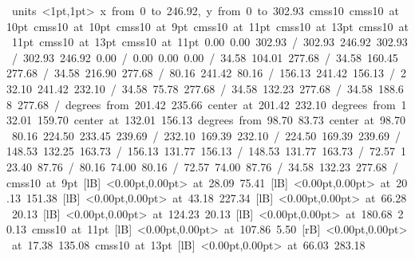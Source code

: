 \hbox{\beginpicture
\setcoordinatesystem units <1pt,1pt>
\setplotarea x from 0 to 246.92, y from 0 to 302.93
\setlinear
\font\picfont cmss10\picfont
\font\picfont cmss10 at 10pt\picfont
\font\picfont cmss10 at 10pt\picfont
\font\picfont cmss10 at 9pt\picfont
\font\picfont cmss10 at 11pt\picfont
\font\picfont cmss10 at 13pt\picfont
\font\picfont cmss10 at 11pt\picfont
\font\picfont cmss10 at 13pt\picfont
\font\picfont cmss10 at 11pt\picfont
\setsolid
{} 0.00 0.00 302.93 /
 302.93 246.92 302.93 /
 302.93 246.92 0.00 /
 0.00 0.00 0.00 /
\setsolid
{} 34.58 104.01 277.68 /
\setsolid
{} 34.58 160.45 277.68 /
\setsolid
{} 34.58 216.90 277.68 /
\setsolid
{} 80.16 241.42 80.16 /
\setsolid
{} 156.13 241.42 156.13 /
\setsolid
{} 232.10 241.42 232.10 /
\setsolid
{} 34.58 75.78 277.68 /
\setsolid
{} 34.58 132.23 277.68 /
\setsolid
{} 34.58 188.68 277.68 /
 degrees from 201.42 235.66 center at 201.42 232.10
 degrees from 132.01 159.70 center at 132.01 156.13
 degrees from 98.70 83.73 center at 98.70 80.16
\setsolid
{} 224.50 233.45 239.69 /
\setsolid
{} 232.10 169.39 232.10 /
\setsolid
{} 224.50 169.39 239.69 /
\setsolid
{} 148.53 132.25 163.73 /
\setsolid
{} 156.13 131.77 156.13 /
\setsolid
{} 148.53 131.77 163.73 /
\setsolid
{} 72.57 123.40 87.76 /
\setsolid
{} 80.16 74.00 80.16 /
\setsolid
{} 72.57 74.00 87.76 /
\setdashpattern <4pt, 4pt>
 34.58 132.23 277.68 /
\font\picfont cmss10 at 9pt\picfont
{}  [lB] <0.00pt,0.00pt> at 28.09 75.41
  [lB] <0.00pt,0.00pt> at 20.13 151.38
  [lB] <0.00pt,0.00pt> at 43.18 227.34
  [lB] <0.00pt,0.00pt> at 66.28 20.13
  [lB] <0.00pt,0.00pt> at 124.23 20.13
  [lB] <0.00pt,0.00pt> at 180.68 20.13
\font\picfont cmss10 at 11pt\picfont
{}  [lB] <0.00pt,0.00pt> at 107.86 5.50
 [rB] <0.00pt,0.00pt> at 17.38 135.08
\font\picfont cmss10 at 13pt\picfont
{}  [lB] <0.00pt,0.00pt> at 66.03 283.18
\endpicture
}
